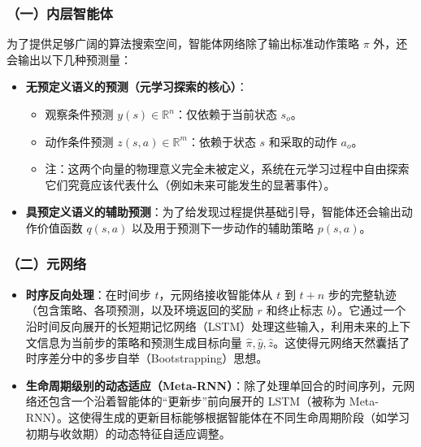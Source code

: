 \hypertarget{ux4e00ux5185ux5c42ux667aux80fdux4f53}{%
\subsubsection{（一）内层智能体}\label{ux4e00ux5185ux5c42ux667aux80fdux4f53}}

为了提供足够广阔的算法搜索空间，智能体网络除了输出标准动作策略 \(\pi\) 外，还会输出以下几种预测量：

\begin{itemize}
\tightlist
\item
  \textbf{无预定义语义的预测（元学习探索的核心）}：

  \begin{itemize}
  \tightlist
  \item
    观察条件预测 \(y(s) \in \mathbb{R}^n\)：仅依赖于当前状态 \(s_o\)。
  \item
    动作条件预测 \(z(s,a) \in \mathbb{R}^m\)：依赖于状态 \(s\) 和采取的动作 \(a_o\)。
  \item
    注：这两个向量的物理意义完全未被定义，系统在元学习过程中自由探索它们究竟应该代表什么（例如未来可能发生的显著事件）。
  \end{itemize}
\item
  \textbf{具预定义语义的辅助预测}：为了给发现过程提供基础引导，智能体还会输出动作价值函数 \(q(s,a)\) 以及用于预测下一步动作的辅助策略 \(p(s,a)\)。
\end{itemize}

\hypertarget{ux4e8cux5143ux7f51ux7edc}{%
\subsubsection{（二）元网络}\label{ux4e8cux5143ux7f51ux7edc}}

\begin{itemize}
\tightlist
\item
  \textbf{时序反向处理}：在时间步 \(t\)，元网络接收智能体从 \(t\) 到 \(t+n\) 步的完整轨迹（包含策略、各项预测，以及环境返回的奖励 \(r\) 和终止标志 \(b\)）。它通过一个沿时间反向展开的长短期记忆网络（LSTM）处理这些输入，利用未来的上下文信息为当前步的策略和预测生成目标向量 \(\hat{\pi}, \hat{y}, \hat{z}\)。这使得元网络天然囊括了时序差分中的多步自举（Bootstrapping）思想。
\item
  \textbf{生命周期级别的动态适应（Meta-RNN）}：除了处理单回合的时间序列，元网络还包含一个沿着智能体的``更新步''前向展开的 LSTM（被称为 Meta-RNN）。这使得生成的更新目标能够根据智能体在不同生命周期阶段（如学习初期与收敛期）的动态特征自适应调整。
\end{itemize}

